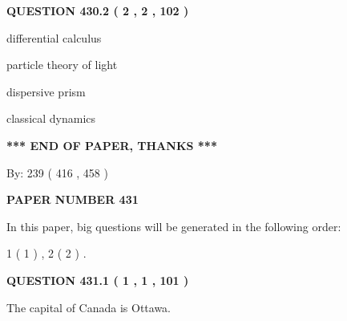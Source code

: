 \documentclass[12pt]{article}
\begin{document}
{\textbf{\Large{QUESTION
430.2 
 ( 2 , 2 , 102 )
}}}
  
  
 
 
\noindent{}
 
 
differential calculus
 
 
particle theory of light
 
 
dispersive prism
 
 
classical dynamics
 
 
 
 
   
   
\vspace{1.0in} 
{\textbf{\large{ *** END OF PAPER, THANKS *** }}} 
   
   
\hspace{1.0in} By: 
 239 ( 416 ,  458 )
   
   
   
   
\newpage 
\setcounter{page}{ 
   431001 } 
   
   
   
   
 {\textbf{ \Large{ PAPER NUMBER  431  }}}
   
   
\vspace{0.2in}
   
   
   
   
   
\vspace{0.2in}
   
In this paper, big questions will be generated in the following order: 
   
   
   1 ( 1 )
 ,
   2 ( 2 )
 .
  
\vspace{0.2in}
  
{\textbf{\Large{QUESTION
431.1 
 ( 1 , 1 , 101 )
}}}
  
  
 
 
\noindent{}
 
 
The capital of Canada is Ottawa.
 
 
 
 
  
\vspace{0.2in}
  
\end{document}
